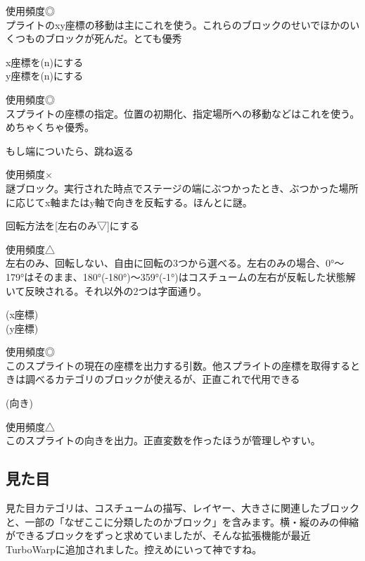 \documentclass[b5paper,10pt]{jsarticle}
\begin{document}
\begin{multicols*}{3}
使用頻度◎\\
プライトのxy座標の移動は主にこれを使う。これらのブロックのせいでほかのいくつものブロックが死んだ。とても優秀
\begin{itembox}{10}
x座標を(n)にする\\y座標を(n)にする
\end{itembox}
使用頻度◎\\
スプライトの座標の指定。位置の初期化、指定場所への移動などはこれを使う。めちゃくちゃ優秀。
\begin{itembox}{11}
もし端についたら、跳ね返る
\end{itembox}
使用頻度×\\
謎ブロック。実行された時点でステージの端にぶつかったとき、ぶつかった場所に応じてx軸またはy軸で向きを反転する。ほんとに謎。
\begin{itembox}{12}
回転方法を[左右のみ▽]にする
\end{itembox}
使用頻度△\\
左右のみ、回転しない、自由に回転の3つから選べる。左右のみの場合、0°～179°はそのまま、180°(-180°)～359°(-1°)はコスチュームの左右が反転した状態解いて反映される。それ以外の2つは字面通り。
\begin{itembox}{13}
(x座標)\\(y座標)
\end{itembox}
使用頻度◎\\
このスプライトの現在の座標を出力する引数。他スプライトの座標を取得するときは調べるカテゴリのブロックが使えるが、正直これで代用できる
\begin{itembox}{14}
(向き)
\end{itembox}
使用頻度△\\
このスプライトの向きを出力。正直変数を作ったほうが管理しやすい。

\subsection{見た目}
見た目カテゴリは、コスチュームの描写、レイヤー、大きさに関連したブロックと、一部の「なぜここに分類したのかブロック」を含みます。横・縦のみの伸縮ができるブロックをずっと求めていましたが、そんな拡張機能が最近TurboWarpに追加されました。控えめにいって神ですね。


\end{multicols*}
\end{document}

